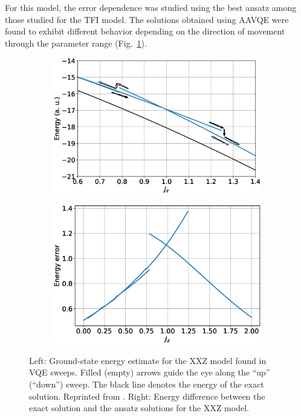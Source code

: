 For this model, the error dependence was studied using the best ansatz among those studied for the TFI model. The solutions obtained using AAVQE were found to exhibit different behavior depending on the direction of movement through the parameter range (Fig.~\ref{fig:dE_xxz}).

\begin{figure}
    \centering
    \begin{subfigure}{.48\linewidth}
        \centering
        \includegraphics[width=\textwidth]{../figures/vqe_hysteresis_xxz_new.eps}
    \end{subfigure}\begin{subfigure}{.48\linewidth}
        \centering
        \includegraphics[width=\textwidth]{../figures/dE_xxz_best.eps}
    \end{subfigure}
    \caption{Left: Ground-state energy estimate for the XXZ model found
    in VQE sweeps. Filled (empty) arrows guide the eye along the
    “up” (“down”) sweep. The black line denotes the energy of the exact solution. Reprinted from \cite{uvarov_machine_2020}. Right: Energy difference between the exact solution and the ansatz solutions for the XXZ model.}
    \label{fig:dE_xxz}
\end{figure}

